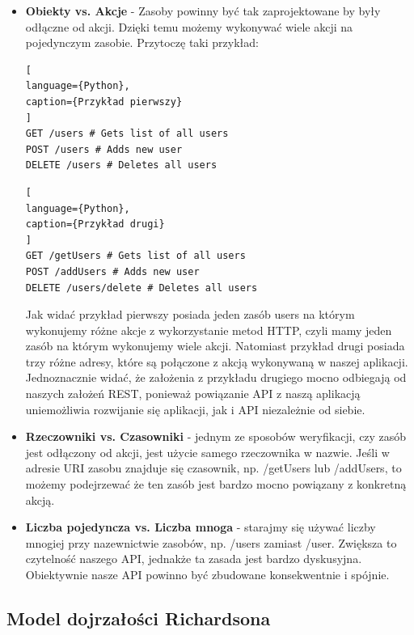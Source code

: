 \documentclass[oneside,polski,logo,indent]{amuthesis}
\begin{document}
\begin{itemize}
\item \textbf{Obiekty vs. Akcje} - Zasoby powinny być tak zaprojektowane by były odłączne od akcji. Dzięki temu możemy wykonywać wiele akcji na pojedynczym zasobie. Przytoczę taki przykład:\newline
\begin{lstlisting}[
language={Python},
caption={Przykład pierwszy}
]
GET /users # Gets list of all users
POST /users # Adds new user
DELETE /users # Deletes all users
\end{lstlisting}

\begin{lstlisting}[
language={Python},
caption={Przykład drugi}
]
GET /getUsers # Gets list of all users
POST /addUsers # Adds new user
DELETE /users/delete # Deletes all users
\end{lstlisting}

Jak widać przykład pierwszy posiada jeden zasób users na którym wykonujemy różne akcje z wykorzystanie metod HTTP, czyli mamy jeden zasób na którym wykonujemy wiele akcji. Natomiast przykład drugi posiada trzy różne adresy, które są połączone z akcją wykonywaną w naszej aplikacji. Jednoznacznie widać, że założenia z przykładu drugiego mocno odbiegają od naszych założeń REST, ponieważ powiązanie API z naszą aplikacją uniemożliwia rozwijanie się aplikacji, jak i API niezależnie od siebie.\newline

\item \textbf{Rzeczowniki vs. Czasowniki} - jednym ze sposobów weryfikacji, czy zasób jest odłączony od akcji, jest użycie samego rzeczownika w nazwie. Jeśli w adresie URI zasobu znajduje się czasownik, np. /getUsers lub /addUsers, to możemy podejrzewać że ten zasób jest bardzo mocno powiązany z konkretną akcją.\newline

\item \textbf{Liczba pojedyncza vs. Liczba mnoga} - starajmy się używać liczby mnogiej przy nazewnictwie zasobów, np. /users zamiast /user. Zwiększa to czytelność naszego API, jednakże ta zasada jest bardzo dyskusyjna. Obiektywnie nasze API powinno być zbudowane konsekwentnie i spójnie. 
\end{itemize}

\begin{center}
\section{Model dojrzałości Richardsona}
\end{center}
\end{document}
